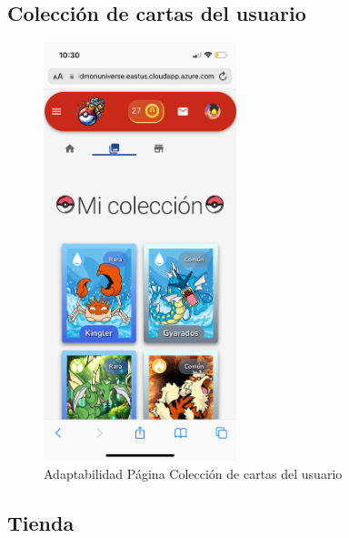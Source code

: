 \subsection*{Colección de cartas del usuario}
\begin{figure}[H]
    \centering
    \includegraphics[width=0.5\textwidth]{figures/adaptabilidad/coleccion.png}
    \caption{Adaptabilidad Página Colección de cartas del usuario}
    \label{fig:Adap-Coleccion}
\end{figure}


\subsection*{Tienda}

